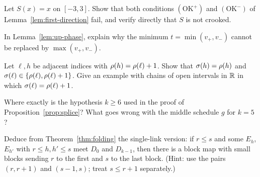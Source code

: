 \begin{exercise}
Let $S(x)=x$ on $[-3,3]$. Show that both conditions $(\mathrm{OK}^+)$ and $(\mathrm{OK}^-)$ of Lemma~\ref{lem:first-direction} fail, and
verify directly that $S$ is not crooked.
\end{exercise}

\begin{exercise}
In Lemma~\ref{lem:up-phase}, explain why the minimum $t=\min(v_+,v_-)$ cannot be replaced by $\max(v_+,v_-)$.
\end{exercise}

\begin{exercise}
Let $\ell,h$ be adjacent indices with $\rho(h)=\rho(\ell)+1$. Show that $\sigma(h)=\rho(h)$ and $\sigma(\ell)\in\left\{ \rho(\ell),\rho(\ell)+1 \right\}$. Give an
example with chains of open intervals in $\mathbb{R}$ in which $\sigma(\ell)=\rho(\ell)+1$.
\end{exercise}

\begin{exercise}
Where exactly is the hypothesis $k\ge6$ used in the proof of Proposition~\ref{prop:splice}? What goes wrong with the middle schedule
$g$ for $k=5$?
\end{exercise}

\begin{exercise}
Deduce from Theorem~\ref{thm:folding} the single-link version: if $r\le s$ and some $E_h$, $E_{h'}$ with $r\le h,h'\le s$ meet $D_0$ and
$D_{k-1}$, then there is a block map with small blocks sending $r$ to the first and $s$ to the last block. (Hint: use the pairs
$(r,r+1)$ and $(s-1,s)$; treat $s\le r+1$ separately.)
\end{exercise}
